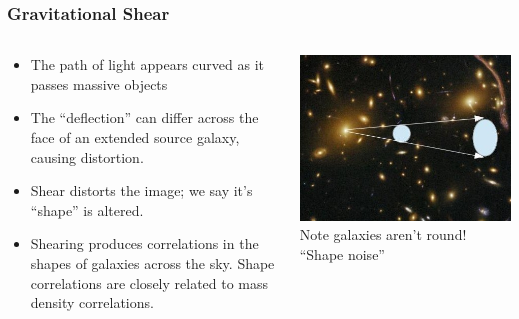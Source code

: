 \documentclass{beamer}
\begin{document}
\frame
{
    \fontsize{10}{\baselineskip}

    \frametitle{Gravitational Shear}

    \begin{columns}

        \begin{column}{0.5\textwidth}

            \begin{itemize}
                \item The path of light appears curved as it passes massive objects
                \item The ``deflection'' can differ across the face of an extended source galaxy, causing distortion.
                \item Shear distorts the image; we say it's ``shape'' is altered.
                \item Shearing produces correlations in the shapes of galaxies across the sky.
                    Shape correlations are closely related to mass density
                    correlations.

            \end{itemize}
        \end{column}
        \begin{column}{0.5\textwidth}
            \includegraphics[width=\textwidth]{shear-illustration-crop.jpg}
            \newline
            Note galaxies aren't round!  ``Shape noise''
        \end{column}
    \end{columns}
}
\end{document}
